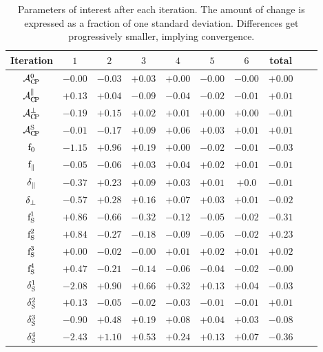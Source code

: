 \begin{table}[t]
\centering
\footnotesize
\begin{tabular}{ c c c c c c c c c | c}
  \hline
  Iteration          &       $1$       &       $2$       &       $3$       &       $4$       &       $5$       &       $6$  & total\\
  \hline
  $\mathcal{A}_{\rm C\!P}^{0}$                       &  $-0.00$  &  $-0.03$  &  $+0.03$  &  $+0.00$  &  $-0.00$  &  $-0.00$  &  $+0.00$    \\
  $\mathcal{A}_{\rm C\!P}^{\parallel}$               &  $+0.13$  &  $+0.04$  &  $-0.09$  &  $-0.04$  &  $-0.02$  &  $-0.01$  &  $+0.01$    \\
  $\mathcal{A}_{\rm C\!P}^{\perp}$                   &  $-0.19$  &  $+0.15$  &  $+0.02$  &  $+0.01$  &  $+0.00$  &  $+0.00$  &  $-0.01$    \\
  $\mathcal{A}_{\rm C\!P}^{\text{S}}$                &  $-0.01$  &  $-0.17$  &  $+0.09$  &  $+0.06$  &  $+0.03$  &  $+0.01$  &  $+0.01$    \\
  \hline
  $\text{f}_{0}$                        &  $-1.15$  &  $+0.96$  &  $+0.19$  &  $+0.00$  &  $-0.02$  &  $-0.01$  &  $-0.03$    \\
  $\text{f}_{\parallel}$                &  $-0.05$  &  $-0.06$  &  $+0.03$  &  $+0.04$  &  $+0.02$  &  $+0.01$  &  $-0.01$    \\
  $\delta_{\parallel}$          &  $-0.37$  &  $+0.23$  &  $+0.09$  &  $+0.03$  &  $+0.01$  &  $+0.0 $  &  $-0.01$    \\
  $\delta_{\perp}$              &  $-0.57$  &  $+0.28$  &  $+0.16$  &  $+0.07$  &  $+0.03$  &  $+0.01$  &  $-0.02$    \\
  \hline
  $\text{f}_{\text{S}}^{1}$                        &  $+0.86$  &  $-0.66$  &  $-0.32$  &  $-0.12$  &  $-0.05$  &  $-0.02$  &  $-0.31$    \\
  $\text{f}_{\text{S}}^{2}$                        &  $+0.84$  &  $-0.27$  &  $-0.18$  &  $-0.09$  &  $-0.05$  &  $-0.02$  &  $+0.23$    \\
  $\text{f}_{\text{S}}^{3}$                        &  $+0.00$  &  $-0.02$  &  $-0.00$  &  $+0.01$  &  $+0.02$  &  $+0.01$  &  $+0.02$    \\
  $\text{f}_{\text{S}}^{4}$                        &  $+0.47$  &  $-0.21$  &  $-0.14$  &  $-0.06$  &  $-0.04$  &  $-0.02$  &  $-0.00$    \\
  $\delta_{\text{S}}^{1}$                    &  $-2.08$  &  $+0.90$  &  $+0.66$  &  $+0.32$  &  $+0.13$  &  $+0.04$  &  $-0.03$    \\
  $\delta_{\text{S}}^{2}$                    &  $+0.13$  &  $-0.05$  &  $-0.02$  &  $-0.03$  &  $-0.01$  &  $-0.01$  &  $+0.01$    \\
  $\delta_{\text{S}}^{3}$                    &  $-0.90$  &  $+0.48$  &  $+0.19$  &  $+0.08$  &  $+0.04$  &  $+0.03$  &  $-0.08$    \\
  $\delta_{\text{S}}^{4}$                    &  $-2.43$  &  $+1.10$  &  $+0.53$  &  $+0.24$  &  $+0.13$  &  $+0.07$  &  $-0.36$    \\
  \hline
\end{tabular}
\caption{Parameters of interest after each iteration. The amount of change is expressed as a fraction of one standard deviation.
         Differences get progressively smaller, implying convergence.}
\label{pars_convergence}
\end{table}

